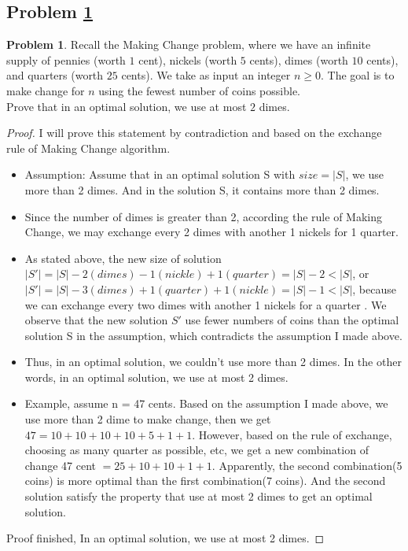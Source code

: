 \documentclass[11pt]{article}
\theoremstyle{definition}
\theoremstyle{definition}
\newtheorem{required}{Problem}
\theoremstyle{definition}
\begin{document}
\subsection{Problem \ref{Exchange1}}
\begin{required} \label{Exchange1}
Recall the Making Change problem, where we have an infinite supply of pennies (worth $1$ cent), nickels (worth $5$ cents), dimes (worth $10$ cents), and quarters (worth $25$ cents). We take as input an integer $n \geq 0$. The goal is to make change for $n$ using the fewest number of coins possible. \\

\noindent Prove that in an optimal solution, we use at most $2$ dimes. 
\end{required}

\begin{proof}
I will prove this statement by contradiction and based on the exchange rule of Making Change algorithm.
\begin{itemize}
\item Assumption: Assume that in an optimal solution S with $size = |S|$, we use more than 2 dimes. And in the solution S, it contains more than 2 dimes.
\item Since the number of dimes is greater than 2, according the rule of Making Change, we may exchange every 2 dimes with another 1 nickels for 1 quarter. 
\item As stated above, the new size of solution $|S'| = |S|- 2(dimes)-1(nickle)+1(quarter) = |S|- 2 < |S|$, or $|S'| = |S| - 3(dimes)+ 1(quarter)+1(nickle) = |S|-1 < |S|$, because we can exchange every two dimes with another 1 nickels for a quarter . We observe that the new  solution $S'$ use fewer numbers of coins than the optimal solution S in the assumption, which contradicts the assumption I made above.
\item Thus, in an optimal solution, we couldn't use more than 2 dimes. In the other words, in an optimal solution, we use at most 2 dimes.
\item Example, assume n = 47 cents. Based on the assumption I made above, we use more than 2 dime to make change, then we get $47 = 10+10+10+10+5+1+1$. However, based on the rule of exchange, choosing as many quarter as possible, etc, we get a new combination of change 47 cent $= 25+10+10+1+1$. Apparently, the second combination(5 coins) is more optimal than the first combination(7 coins). And the second solution satisfy the property that use at most 2 dimes to get an optimal solution.   
\end{itemize}
Proof finished, In an optimal solution, we use at most 2 dimes.
\end{proof}
\end{document}

